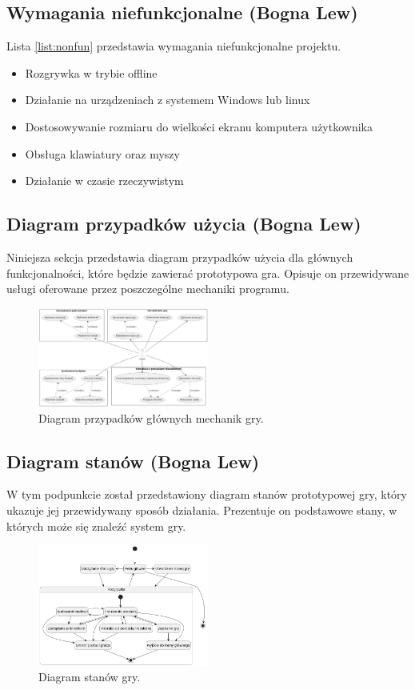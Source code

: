 \subsection{Wymagania niefunkcjonalne (Bogna Lew)}\label{ss:nonfun}
Lista \ref{list:nonfun} przedstawia wymagania niefunkcjonalne projektu.
\begin{itemize}\label{list:nonfun}
  \item Rozgrywka w trybie offline
  \item Działanie na urządzeniach z systemem Windows lub linux
  \item Dostosowywanie rozmiaru do wielkości ekranu komputera użytkownika
  \item Obsługa klawiatury oraz myszy
  \item Działanie w czasie rzeczywistym
\end{itemize}

\subsection{Diagram przypadków użycia (Bogna Lew)}\label{ss:usecase}
Niniejsza sekcja przedstawia diagram przypadków użycia dla głównych funkcjonalności, które będzie zawierać prototypowa gra.
Opisuje on przewidywane usługi oferowane przez poszczególne mechaniki programu.
\begin{figure}[htbp]
    \centering
    \includegraphics[width=0.5\textwidth]{images/diagrams/usecase.png}
    \caption{Diagram przypadków głównych mechanik gry.}\label{fig:usecases}
\end{figure}

\subsection{Diagram stanów (Bogna Lew)}\label{ss:state}
W tym podpunkcie został przedstawiony diagram stanów prototypowej gry, który ukazuje jej przewidywany sposób działania.
Prezentuje on podstawowe stany, w których może się znaleźć system gry.
\begin{figure}[htbp]
    \centering
    \includegraphics[width=0.5\textwidth]{images/diagrams/state.png}
    \caption{Diagram stanów gry.}\label{fig:states}
\end{figure}

